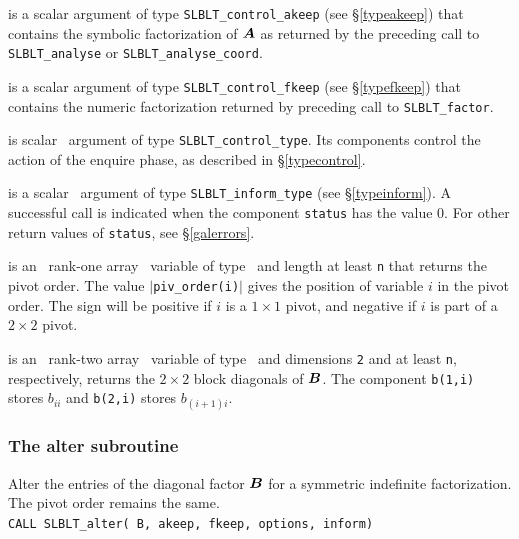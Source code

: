 \documentclass{galahad}
\newcommand{\packagename}{SLBLT}
\begin{document}
\begin{description}
 is a scalar \intentin argument of type
{\tt \packagename\_control\_akeep} (see \S\ref{typeakeep}) that contains the 
symbolic factorization of ${\bm{A}}$ as returned by the preceding call
to {\tt \packagename\_analyse} or {\tt \packagename\_analyse\_coord}.

 is a scalar \intentin argument of type
{\tt \packagename\_control\_fkeep} (see \S\ref{typefkeep}) that contains the 
numeric factorization returned by preceding call to {\tt \packagename\_factor}.

 is scalar \intentin\ argument of type
{\tt \packagename\_control\_type}. Its components control the action
of the enquire phase, as described in \S\ref{typecontrol}.

 is a scalar \intentinout\ argument of type
{\tt \packagename\_inform\_type} (see \S\ref{typeinform}).
A successful call is indicated when the  component {\tt status} has the value 0.
For other return values of {\tt status}, see \S\ref{galerrors}.

 is an \optional\ rank-one array \intentout\ variable of type 
\integer\ and length at least {\tt n} that returns the pivot order.
The value $|${\tt piv\_order(i)}$|$ gives the position of variable
$i$ in the pivot order. The sign will be positive if $i$ is a
$1\times1$ pivot, and negative if $i$ is
part of a $2 \times 2$ pivot.

 is an \optional\ rank-two array \intentout\ variable of type \realdp\ 
and dimensions {\tt 2} and at least {\tt n}, respectively,
returns the $2\times2$ block diagonals of ${\bm{B}}$. The component
{\tt b(1,i)} stores $b_{ii}$ and {\tt b(2,i)} stores $b_{(i+1)i}$.

\end{description}


\subsubsection{The alter subroutine}

Alter the entries of the diagonal factor ${\bm{B}}$ for a symmetric indefinite
factorization. The pivot order remains the same. \\

\hskip0.5in
{\tt CALL \packagename\_alter( B, akeep, fkeep, options, inform)}
\end{document}
